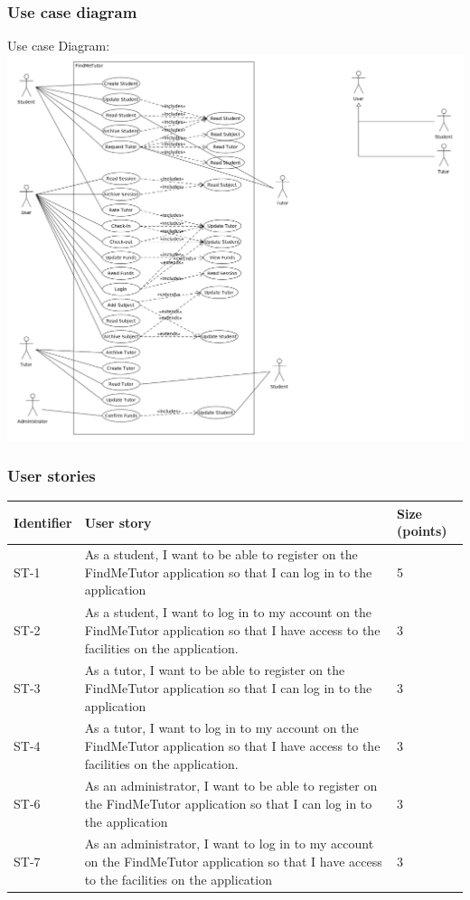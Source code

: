 \documentclass[12pt]{article}
\begin{document}
{	\newpage
\subsubsection{Use case diagram}
Use case Diagram:
		\centering
		\includegraphics[width=140mm]{./Sprint3Models/Use_Case_Diagram.png}


\newpage
\subsubsection{User stories}
{

\begin{longtable}{| l | p{10cm}| l |}
			\hline
			\textbf{Identifier} & \textbf{User story} & \textbf{Size (points)}

						\\ \hline ST-1 & As a student, I want to be able to register on the FindMeTutor application so that I can log in to the application  & 5
			\\ \hline ST-2 & As a student, I want to  log in to my account on the FindMeTutor application so that I have access to the facilities on the application.  & 3
			\\ \hline ST-3 & As a tutor, I want to be able to register on the FindMeTutor application so that I can log in to the application  & 3
																\\ \hline ST-4 & As a tutor, I want to  log in to my account on the FindMeTutor application so that I have access to the facilities on the application.  & 3
																\\ \hline ST-6 & As an administrator, I want to be able to register on the FindMeTutor application so that I can log in to the application  & 3
													\\ \hline ST-7 & As an administrator, I want to  log in to my account on the FindMeTutor application so that I have access to the facilities on the application  &3


\end{longtable}}}
\end{document}
